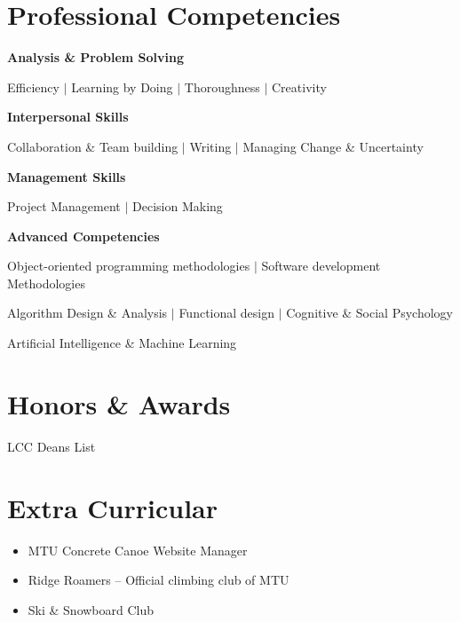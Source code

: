 \documentclass[12pt]{article}
\begin{document}
\section{Professional Competencies}
\begin{center}
{\bfseries Analysis \& Problem Solving}

Efficiency $|$ Learning by Doing $|$ Thoroughness $|$ Creativity
    \vspace{1em}

{\bfseries Interpersonal Skills}\hfill

    Collaboration \& Team building $|$ Writing $|$ Managing Change \& Uncertainty
    \vspace{1em}

{\bfseries Management Skills}

Project Management $|$ Decision Making
    \vspace{1em}

{\bfseries Advanced Competencies}

Object-oriented programming methodologies $|$ Software development Methodologies

Algorithm Design \& Analysis  $|$ Functional design $|$ Cognitive \& Social Psychology

    Artificial Intelligence \& Machine Learning


\end{center}

%
%
%



\section{Honors \& Awards}

 LCC Deans List \hfill


\section{Extra Curricular}
\begin{itemize}[label=]
\item MTU Concrete Canoe Website Manager

\item Ridge Roamers -- Official climbing club of MTU
\item Ski \& Snowboard Club

\end{itemize}
\end{document}
